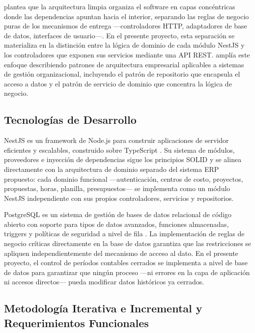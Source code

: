 \documentclass{univalle-perfil}
\begin{document}
\textcite{martin2017} plantea que la arquitectura limpia organiza el software en capas concéntricas donde las dependencias apuntan hacia el interior, separando las reglas de negocio puras de los mecanismos de entrega —controladores HTTP, adaptadores de base de datos, interfaces de usuario—. En el presente proyecto, esta separación se materializa en la distinción entre la lógica de dominio de cada módulo NestJS y los controladores que exponen sus servicios mediante una API REST. \textcite{fowler2002} amplía este enfoque describiendo patrones de arquitectura empresarial aplicables a sistemas de gestión organizacional, incluyendo el patrón de repositorio que encapsula el acceso a datos y el patrón de servicio de dominio que concentra la lógica de negocio.

\subsection{Tecnologías de Desarrollo}

NestJS es un framework de Node.js para construir aplicaciones de servidor eficientes y escalables, construido sobre TypeScript \parencite{nestjs2024}. Su sistema de módulos, proveedores e inyección de dependencias sigue los principios SOLID y se alinea directamente con la arquitectura de dominio separado del sistema ERP propuesto: cada dominio funcional —autenticación, centros de costo, proyectos, propuestas, horas, planilla, presupuestos— se implementa como un módulo NestJS independiente con sus propios controladores, servicios y repositorios.

PostgreSQL es un sistema de gestión de bases de datos relacional de código abierto con soporte para tipos de datos avanzados, funciones almacenadas, triggers y políticas de seguridad a nivel de fila \parencite{postgresql2024}. La implementación de reglas de negocio críticas directamente en la base de datos garantiza que las restricciones se apliquen independientemente del mecanismo de acceso al dato. En el presente proyecto, el control de períodos contables cerrados se implementa a nivel de base de datos para garantizar que ningún proceso —ni errores en la capa de aplicación ni accesos directos— pueda modificar datos históricos ya cerrados.

\subsection{Metodología Iterativa e Incremental y Requerimientos Funcionales}
\end{document}
